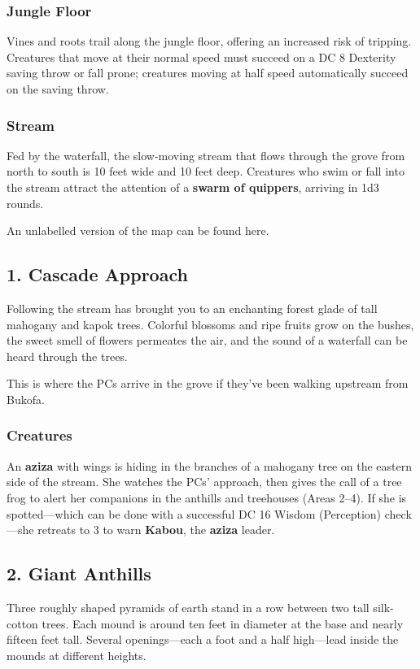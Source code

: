 \documentclass[10pt,a4paper,twoside,bg=print,twocolumn,openany,nodeprecatedcode]{dndbook}
\begin{document}
\subsubsection{Jungle Floor}
Vines and roots trail along the jungle floor, offering an increased risk of tripping. Creatures that move at their normal speed must succeed on a DC 8 Dexterity saving throw or fall prone; creatures moving at half speed automatically succeed on the saving throw.

\subsubsection{Stream}
Fed by the waterfall, the slow-moving stream that flows through the grove from north to south is 10 feet wide and 10 feet deep. Creatures who swim or fall into the stream attract the attention of a \textbf{swarm of quippers}, arriving in 1d3 rounds.

An unlabelled version of the map can be found here.

\subsection{1. Cascade Approach}
\begin{DndReadAloud}{}
Following the stream has brought you to an enchanting forest glade of tall mahogany and kapok trees. Colorful blossoms and ripe fruits grow on the bushes, the sweet smell of flowers permeates the air, and the sound of a waterfall can be heard through the trees.

\end{DndReadAloud}

This is where the PCs arrive in the grove if they've been walking upstream from Bukofa.

\subsubsection{Creatures}
An \textbf{aziza} with wings is hiding in the branches of a mahogany tree on the eastern side of the stream. She watches the PCs' approach, then gives the call of a tree frog to alert her companions in the anthills and treehouses (Areas 2–4). If she is spotted—which can be done with a successful DC 16 Wisdom (Perception) check—she retreats to 3 to warn \textbf{Kabou}, the \textbf{aziza} leader.

\subsection{2. Giant Anthills}
\begin{DndReadAloud}{}
Three roughly shaped pyramids of earth stand in a row between two tall silk-cotton trees. Each mound is around ten feet in diameter at the base and nearly fifteen feet tall. Several openings—each a foot and a half high—lead inside the mounds at different heights.

\end{DndReadAloud}
\end{document}
